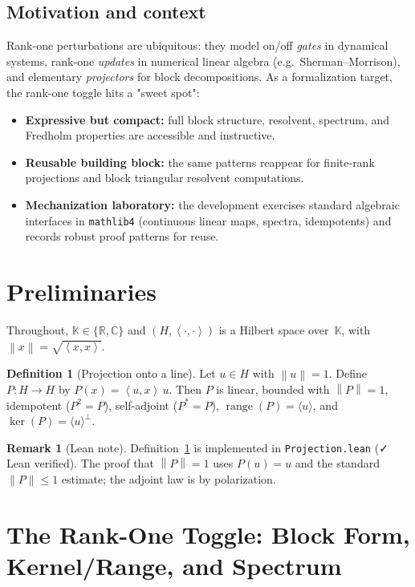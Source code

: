 \documentclass[11pt]{article}
\theoremstyle{definition}
\newtheorem{definition}[theorem]{Definition}
\newtheorem{remark}[theorem]{Remark}
\newcommand{\K}{\mathbb{K}}
\newcommand{\R}{\mathbb{R}}
\newcommand{\C}{\mathbb{C}}
\newcommand{\ip}[2]{\left\langle #1,#2\right\rangle}
\newcommand{\norm}[1]{\left\lVert #1\right\rVert}
\DeclareMathOperator{\range}{range}
\DeclareMathOperator{\kerop}{ker}
\newcommand{\leanok}{\textsf{\small \textcolor{green!60!black}{✓ Lean verified}}}
\begin{document}
\subsection*{Motivation and context}
Rank-one perturbations are ubiquitous: they model on/off \emph{gates} in dynamical systems, rank-one \emph{updates} in numerical linear algebra (e.g.\ Sherman--Morrison), and elementary \emph{projectors} for block decompositions. As a formalization target, the rank-one toggle hits a "sweet spot":
\begin{itemize}
\item \textbf{Expressive but compact:} full block structure, resolvent, spectrum, and Fredholm properties are accessible and instructive.
\item \textbf{Reusable building block:} the same patterns reappear for finite-rank projections and block triangular resolvent computations.
\item \textbf{Mechanization laboratory:} the development exercises standard algebraic interfaces in \texttt{mathlib4} (continuous linear maps, spectra, idempotents) and records robust proof patterns for reuse.
\end{itemize}

\section{Preliminaries}

Throughout, $\K\in\{\R,\C\}$ and $(H,\ip{\cdot}{\cdot})$ is a Hilbert space over~$\K$, with $\norm{x}=\sqrt{\ip{x}{x}}$.

\begin{definition}[Projection onto a line]\label{def:proj}
Let $u\in H$ with $\norm{u}=1$. Define $P:H\to H$ by $P(x)=\ip{u}{x}\,u$. Then $P$ is linear, bounded with $\norm{P}=1$, idempotent ($P^2=P$), self-adjoint ($P^\ast=P$), $\range(P)=\langle u\rangle$, and $\kerop(P)=\langle u\rangle^\perp$.
\end{definition}

\begin{remark}[Lean note]
Definition~\ref{def:proj} is implemented in \texttt{Projection.lean} (\leanok). The proof that $\norm{P}=1$ uses $P(u)=u$ and the standard $\lVert P\rVert\le 1$ estimate; the adjoint law is by polarization.
\end{remark}

\section{The Rank-One Toggle: Block Form, Kernel/Range, and Spectrum}\label{sec:toggle}
\end{document}
